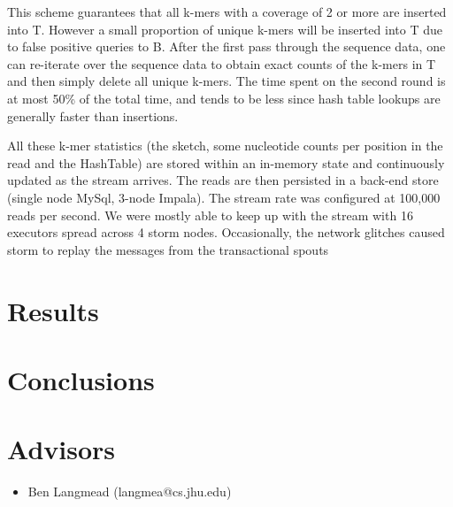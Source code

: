 \documentclass[11pt]{article}
\begin{document}
This scheme guarantees that all k-mers with a coverage of 2 or more are inserted into T. However a small proportion of unique k-mers will be inserted into T due to false positive queries to B. After the first pass through the sequence data, one can re-iterate over the sequence data to obtain exact counts of the k-mers in T and then simply delete all unique k-mers. The time spent on the second round is at most 50\% of the total time, and tends to be less since hash table lookups are generally faster than insertions. 

All these k-mer statistics (the sketch, some nucleotide counts per position in the read and the HashTable) are stored within an in-memory state and continuously updated as the stream arrives. The reads are then persisted in a back-end store (single node MySql, 3-node Impala). The stream rate was configured at 100,000 reads per second. We were mostly able to keep up with the stream with 16 executors spread across 4 storm nodes. Occasionally, the network glitches caused storm to replay the messages from the transactional spouts 

\section{Results}

\section{Conclusions}

\section{Advisors}
\begin{itemize}
	\item Ben Langmead (langmea@cs.jhu.edu)
\end{itemize}


\nocite{*}


\end{document}
